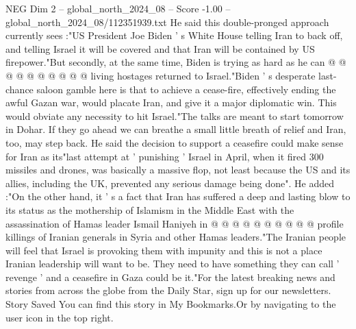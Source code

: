 \begin{textsample}{NEG Dim 2 – global\_north\_2024\_08 – Score -1.00 – global\_north\_2024\_08/112351939.txt}
He said this double-pronged approach currently sees :"US President Joe Biden ' s White House telling Iran to back off, and telling Israel it will be covered and that Iran will be contained by US firepower."But secondly, at the same time, Biden is trying as hard as he can @ @ @ @ @ @ @ @ @ @ living hostages returned to Israel."Biden ' s desperate last-chance saloon gamble here is that to achieve a cease-fire, effectively ending the awful Gazan war, would placate Iran, and give it a major diplomatic win.
This would obviate any necessity to hit Israel."The talks are meant to start tomorrow in Dohar.
If they go ahead we can breathe a small little breath of relief and Iran, too, may step back.
He said the decision to support a ceasefire could make sense for Iran as its"last attempt at ' punishing ' Israel in April, when it fired 300 missiles and drones, was basically a massive flop, not least because the US and its allies, including the UK, prevented any serious damage being done".
He added :"On the other hand, it ' s a fact that Iran has suffered a deep and lasting blow to its status as the mothership of Islamism in the Middle East with the assassination of Hamas leader Ismail Haniyeh in @ @ @ @ @ @ @ @ @ @ profile killings of Iranian generals in Syria and other Hamas leaders."The Iranian people will feel that Israel is provoking them with impunity and this is not a place Iranian leadership will want to be.
They need to have something they can call ' revenge ' and a ceasefire in Gaza could be it."For the latest breaking news and stories from across the globe from the Daily Star, sign up for our newsletters.
Story Saved You can find this story in My Bookmarks.Or by navigating to the user icon in the top right.

\end{textsample}
